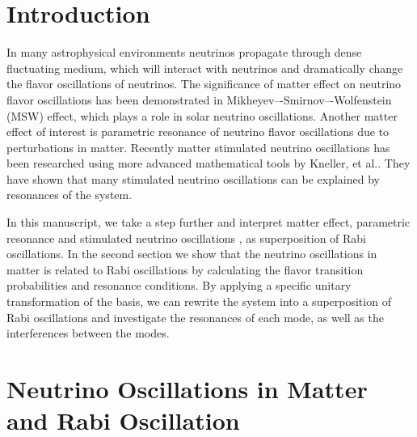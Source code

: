 \documentclass[%
preprint,
 amsmath,amssymb,
 aps,
]{revtex4-1}
\begin{document}
\maketitle


\section{\label{introduction}Introduction}

In many astrophysical environments neutrinos propagate through dense fluctuating medium, which will interact with neutrinos and dramatically change the flavor oscillations of neutrinos. The significance of matter effect on neutrino flavor oscillations has been demonstrated in Mikheyev–-Smirnov–-Wolfenstein (MSW) effect, which plays a role in solar neutrino oscillations.\cite{wolf78} Another matter effect of interest is parametric resonance of neutrino flavor oscillations due to perturbations in matter.\cite{Krastev1989} Recently matter stimulated neutrino oscillations has been researched using more advanced mathematical tools by Kneller, et al..\cite{Kneller2013,Patton2014} They have shown that many stimulated neutrino oscillations can be explained by resonances of the system. 

In this manuscript, we take a step further and interpret matter effect, parametric resonance \cite{Akhmedov2000, Krastev1989} and stimulated neutrino oscillations \cite{Kneller2013, Patton2014}, as superposition of Rabi oscillations. In the second section we show that the neutrino oscillations in matter is related to Rabi oscillations by calculating the flavor transition probabilities and resonance conditions.  By applying a specific unitary transformation of the basis, we can rewrite the system into a superposition of Rabi oscillations and investigate the resonances of each mode, as well as the interferences between the modes.



\section{\label{rabi}Neutrino Oscillations in Matter and Rabi Oscillation}%
\end{document}
